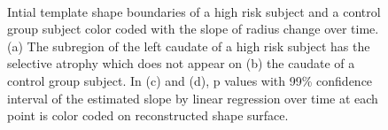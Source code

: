 \documentclass{llncs}
\begin{document}
\begin{figure}[htb!]
\centering
   \\
\caption{ Intial template shape boundaries of a high risk subject and a control group subject color coded with the slope of radius change over time. (a) The subregion of the left caudate of a high risk subject has the selective atrophy which does not appear on (b) the caudate of a control group subject. In (c) and (d), p values with 99\% confidence interval of the estimated slope by linear regression over time at each point is color coded on reconstructed shape surface. }
\label{figRadiusSlope}
\end{figure}
\end{document}
